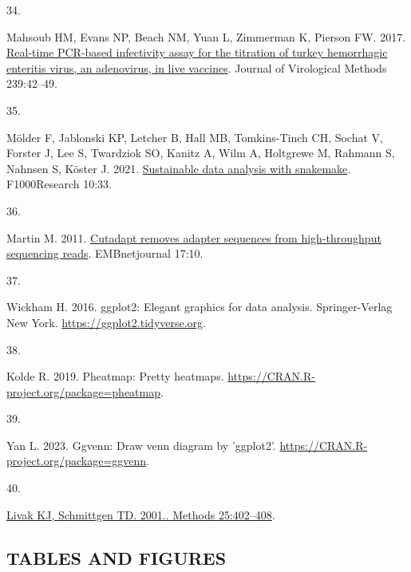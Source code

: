 \documentclass[
]{article}
\newlength{\cslhangindent}
\newlength{\csllabelwidth}
\newenvironment{CSLReferences}[2] %
 {\begin{list}{}{%
  \setlength{\itemindent}{0pt}
  \setlength{\leftmargin}{0pt}
  \setlength{\parsep}{0pt}
  \ifodd #1
   \setlength{\leftmargin}{\cslhangindent}
   \setlength{\itemindent}{-1\cslhangindent}
  \fi
  \setlength{\itemsep}{#2\baselineskip}}}
 {\end{list}}
\newcommand{\CSLLeftMargin}[1]{\parbox[t]{\csllabelwidth}{\strut#1\strut}}
\newcommand{\CSLRightInline}[1]{\parbox[t]{\linewidth - \csllabelwidth}{\strut#1\strut}}
\begin{document}
\begin{CSLReferences}{0}{1}
\CSLLeftMargin{34. }%
\CSLRightInline{Mahsoub HM, Evans NP, Beach NM, Yuan L, Zimmerman K,
Pierson FW. 2017.
\href{https://doi.org/10.1016/j.jviromet.2016.11.002}{Real-time
{PCR}-based infectivity assay for the titration of turkey hemorrhagic
enteritis virus, an adenovirus, in live vaccines}. Journal of
Virological Methods 239:42--49.}

\CSLLeftMargin{35. }%
\CSLRightInline{Mölder F, Jablonski KP, Letcher B, Hall MB,
Tomkins-Tinch CH, Sochat V, Forster J, Lee S, Twardziok SO, Kanitz A,
Wilm A, Holtgrewe M, Rahmann S, Nahnsen S, Köster J. 2021.
\href{https://doi.org/10.12688/f1000research.29032.2}{Sustainable data
analysis with snakemake}. F1000Research 10:33.}

\CSLLeftMargin{36. }%
\CSLRightInline{Martin M. 2011.
\href{https://doi.org/10.14806/ej.17.1.200}{Cutadapt removes adapter
sequences from high-throughput sequencing reads}. EMBnetjournal 17:10.}

\CSLLeftMargin{37. }%
\CSLRightInline{Wickham H. 2016. ggplot2: Elegant graphics for data
analysis. Springer-Verlag New York.
\url{https://ggplot2.tidyverse.org}.}

\CSLLeftMargin{38. }%
\CSLRightInline{Kolde R. 2019. Pheatmap: Pretty heatmaps.
\url{https://CRAN.R-project.org/package=pheatmap}.}

\CSLLeftMargin{39. }%
\CSLRightInline{Yan L. 2023. Ggvenn: Draw venn diagram by 'ggplot2'.
\url{https://CRAN.R-project.org/package=ggvenn}.}

\CSLLeftMargin{40. }%
\CSLRightInline{\href{https://doi.org/10.1006/meth.2001.1262}{Livak KJ,
Schmittgen TD. 2001.. Methods 25:402--408}.}

\end{CSLReferences}

\setlength{\parindent}{0in}
\setlength{\leftskip}{0in}
\newpage

\newpage

\subsection{TABLES AND FIGURES}\label{tables-and-figures}
\end{document}
